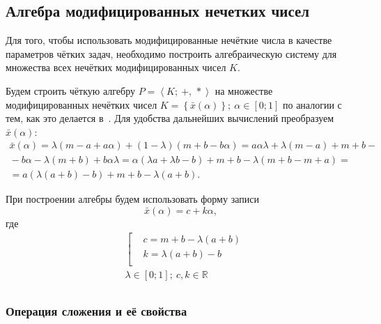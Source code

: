 \subsection{Алгебра модифицированных нечетких чисел}
Для того, чтобы использовать модифицированные нечёткие числа в качестве параметров чётких задач, необходимо построить алгебраическую систему для множества всех нечётких модифицированных чисел $K$.

Будем строить чёткую алгебру $P=\left\langle K ;\ +,\,* \right\rangle$ на множестве модифицированных нечётких чисел $K=\left\{ \bar{x}\left( \alpha  \right) \right\};\ \alpha \in \left[ 0;1 \right]$ по аналогии с тем, как это делается в~\cite{Yakhyaeva}. Для удобства дальнейших вычислений преобразуем $\bar{x}\left( \alpha \right)$:
\begin{gather*}
  \bar{x}\left( \alpha  \right)=\lambda \left( m-a+a\alpha  \right)+\left( 1-\lambda  \right)\left( m+b-b\alpha  \right)=a\alpha \lambda +\lambda \left( m-a \right)+m+b-{}\\
  {}-b\alpha -\lambda \left( m+b \right)+b\alpha \lambda =\alpha \left( \lambda a+\lambda b-b \right)+m+b-\lambda \left( m+b-m+a \right)={}\\
  {}=a\left( \lambda \left( a+b \right)-b \right)+m+b-\lambda \left( a+b \right).
\end{gather*}

При построении алгебры будем использовать форму записи
\begin{equation}
\label{eq:modified-number-base}
  \bar{x}\left( \alpha  \right)=c+k\alpha,
\end{equation}
где
\begin{equation}
\label{eq:modified-number-from-abm}
  \begin{aligned}
    & \left[ \begin{aligned}
    & c=m+b-\lambda \left( a+b \right) \\ 
    & k=\lambda \left( a+b \right)-b \\ 
  \end{aligned} \right. \\ 
  & \lambda \in \left[ 0;1 \right];\ c,k\in \mathbb{R} \\ 
\end{aligned}
\end{equation}

\subsubsection*{Операция сложения и её свойства}


